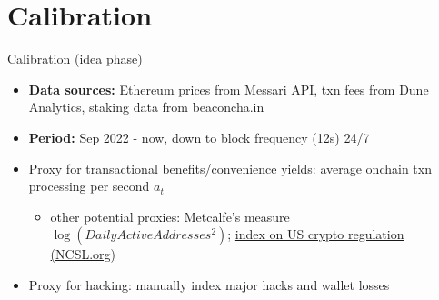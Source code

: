 \documentclass{beamer}
\begin{document}
\section{Calibration}
\begin{frame}{Calibration (idea phase)}
    \begin{itemize}
        \item \textbf{Data sources:} Ethereum prices from Messari API, txn fees from Dune Analytics, staking data from beaconcha.in
        \item \textbf{Period:} Sep 2022 - now, down to block frequency (12s) 24/7
        \item Proxy for transactional benefits/convenience yields: average onchain txn processing per second $a_t$\citep{cong2022staking}
        \begin{itemize}
            \item other potential proxies: Metcalfe's measure $\log(DailyActiveAddresses^2)$; \href{https://www.ncsl.org/financial-services/cryptocurrency-2023-legislation}{index on US crypto regulation (NCSL.org)}
        \end{itemize}

        \item Proxy for hacking: manually index major hacks and wallet losses
    \end{itemize}
\end{frame}


\end{document}

